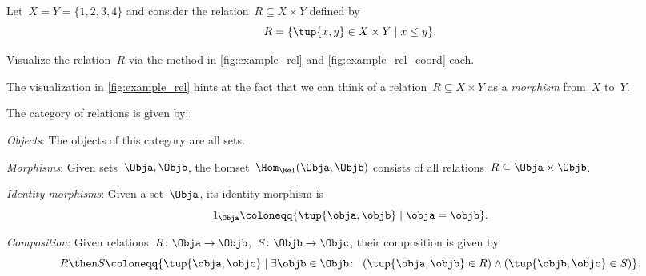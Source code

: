 \begin{exercise}
    Let~$X = Y = \{1, 2, 3, 4 \}$ and consider the relation~$R \subseteq X \times Y$ defined by
    \begin{equation}
        R = \{ \tup{x,y} \in X \times Y \mid x \leq y \}.
    \end{equation}

    Visualize the relation~$R$ via the method in \cref{fig:example_rel} and \cref{fig:example_rel_coord} each.
\end{exercise}

The visualization in \cref{fig:example_rel} hints at the fact that we can think of a relation~$R \subseteq X \times Y$ as a \emph{morphism} from~$X$ to~$Y$.

\begin{ctdefinition}
    The category \iindex{\Rel} of relations \Rel is given by:
    \begin{compactenum}
        \item \emph{Objects}: The objects of this category are all sets.
        \item \emph{Morphisms}: Given sets~$\Obja, \Objb$, the homset~$\Hom_{\Rel}(\Obja,\Objb)$ consists of all
        relations~$R\subseteq \Obja\times \Objb$.
        \item \emph{Identity morphisms}: Given a set~$\Obja$, its identity morphism is
        \begin{equation}
            1_\Obja \coloneqq \{ \tup{\obja,\objb} \mid  \obja = \objb \}.
        \end{equation}
        \item \emph{Composition}: Given relations~$R \colon \Obja\to \Objb$,~$S\colon \Objb\to \Objc$, their composition is given by
        \begin{equation}
            \label{RelCompRule}
            R \then S \coloneqq \{\tup{\obja,\objc} \mid  \exists \objb \in \Objb \colon \ \left(\tup{\obja,\objb} \in R\right) \wedge \left(\tup{\objb,\objc} \in S\right)\}.
        \end{equation}
    \end{compactenum}
\end{ctdefinition}

